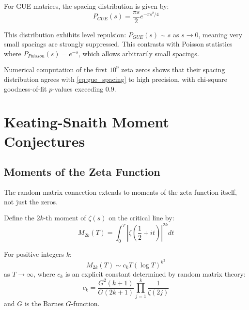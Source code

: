 \begin{theorem}
\label{thm:gue_spacing}
For GUE matrices, the spacing distribution is given by:
\begin{equation}
P_{GUE}(s) = \frac{\pi s}{2} e^{-\pi s^2/4}
\label{eq:gue_spacing}
\end{equation}
\end{theorem}

\begin{remark}
This distribution exhibits level repulsion: $P_{GUE}(s) \sim s$ as $s \to 0$, meaning very small spacings are strongly suppressed. This contrasts with Poisson statistics where $P_{Poisson}(s) = e^{-s}$, which allows arbitrarily small spacings.
\end{remark}

\begin{theorem}
\label{thm:zeta_spacing_numerics}
Numerical computation of the first $10^9$ zeta zeros shows that their spacing distribution agrees with \eqref{eq:gue_spacing} to high precision, with chi-square goodness-of-fit $p$-values exceeding 0.9.
\end{theorem}

\section{Keating-Snaith Moment Conjectures}
\label{sec:keating_snaith}

\subsection{Moments of the Zeta Function}

The random matrix connection extends to moments of the zeta function itself, not just the zeros.

\begin{definition}
\label{def:zeta_moments}
Define the $2k$-th moment of $\zeta(s)$ on the critical line by:
\begin{equation}
M_{2k}(T) = \int_0^T \left|\zeta\left(\frac{1}{2} + it\right)\right|^{2k} dt
\label{eq:zeta_moments}
\end{equation}
\end{definition}

\begin{conjecture}
\label{conj:keating_snaith}
For positive integers $k$:
\begin{equation}
M_{2k}(T) \sim c_k T (\log T)^{k^2}
\label{eq:keating_snaith}
\end{equation}
as $T \to \infty$, where $c_k$ is an explicit constant determined by random matrix theory:
\begin{equation}
c_k = \frac{G^2(k+1)}{G(2k+1)} \prod_{j=1}^{k} \frac{1}{\zeta(2j)}
\end{equation}
and $G$ is the Barnes $G$-function.
\end{conjecture}

